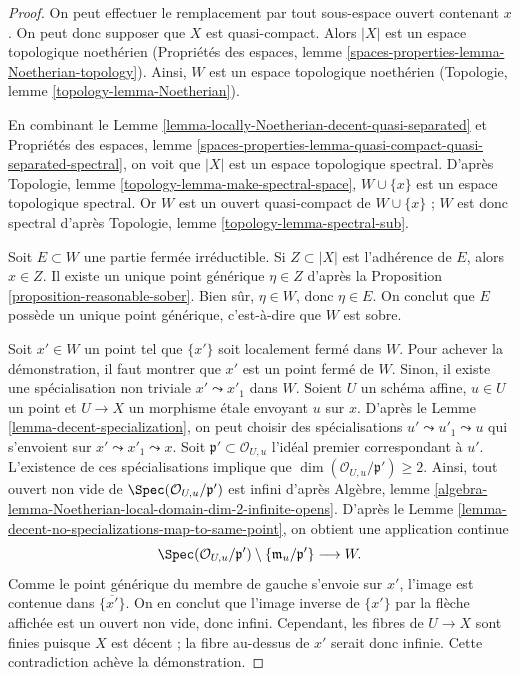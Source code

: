 \begin{proof}
On peut effectuer le remplacement par tout sous-espace ouvert contenant $x$.
On peut donc supposer que $X$ est quasi-compact.
Alors $|X|$ est un espace topologique noethérien
(Propriétés des espaces, lemme
\ref{spaces-properties-lemma-Noetherian-topology}).
Ainsi, $W$ est un espace topologique noethérien
(Topologie, lemme \ref{topology-lemma-Noetherian}).

\medskip\noindent
En combinant le Lemme \ref{lemma-locally-Noetherian-decent-quasi-separated}
et Propriétés des espaces, lemme
\ref{spaces-properties-lemma-quasi-compact-quasi-separated-spectral},
on voit que $|X|$ est un espace topologique spectral.
D'après Topologie, lemme \ref{topology-lemma-make-spectral-space},
$W \cup \{x\}$ est un espace topologique spectral.
Or $W$ est un ouvert quasi-compact de $W \cup \{x\}$ ; $W$ est donc spectral
d'après Topologie, lemme \ref{topology-lemma-spectral-sub}.

\medskip\noindent
Soit $E \subset W$ une partie fermée irréductible. Si $Z \subset |X|$ est
l'adhérence de $E$, alors $x \in Z$. Il existe un unique point générique
$\eta \in Z$ d'après la Proposition \ref{proposition-reasonable-sober}.
Bien sûr, $\eta \in W$, donc $\eta \in E$. On conclut que $E$ possède un
unique point générique, c'est-à-dire que $W$ est sobre.

\medskip\noindent
Soit $x' \in W$ un point tel que $\{x'\}$ soit localement fermé dans $W$.
Pour achever la démonstration, il faut montrer que $x'$ est un point fermé de
$W$. Sinon, il existe une spécialisation non triviale
$x' \leadsto x'_1$ dans $W$. Soient $U$ un schéma affine, $u \in U$ un point
et $U \to X$ un morphisme étale envoyant $u$ sur $x$. D'après le
Lemme \ref{lemma-decent-specialization}, on peut choisir des spécialisations
$u' \leadsto u'_1 \leadsto u$ qui s'envoient sur
$x' \leadsto x'_1 \leadsto x$.
Soit $\mathfrak p' \subset \mathcal{O}_{U, u}$ l'idéal premier correspondant
à $u'$. L'existence de ces spécialisations implique que
$\dim(\mathcal{O}_{U, u}/\mathfrak p') \geq 2$.
Ainsi, tout ouvert non vide de
$\Spec(\mathcal{O}_{U, u}/\mathfrak p')$ est infini d'après Algèbre, lemme
\ref{algebra-lemma-Noetherian-local-domain-dim-2-infinite-opens}.
D'après le Lemme \ref{lemma-decent-no-specializations-map-to-same-point},
on obtient une application continue
$$
\Spec(\mathcal{O}_{U, u}/\mathfrak p')
\setminus \{\mathfrak m_u/\mathfrak p'\}
\longrightarrow
W.
$$
Comme le point générique du membre de gauche s'envoie sur $x'$, l'image est
contenue dans $\overline{\{x'\}}$. On en conclut que l'image inverse de
$\{x'\}$ par la flèche affichée est un ouvert non vide, donc infini.
Cependant, les fibres de $U \to X$ sont finies puisque $X$ est décent ; la
fibre au-dessus de $x'$ serait donc infinie. Cette contradiction achève la
démonstration.
\end{proof}






